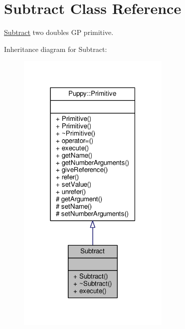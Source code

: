 \hypertarget{classSubtract}{}\section{Subtract Class Reference}
\label{classSubtract}


\hyperlink{classSubtract}{Subtract} two doubles G\+P primitive.  




Inheritance diagram for Subtract\+:
\nopagebreak
\begin{figure}[H]
\begin{center}
\leavevmode
\includegraphics[width=207pt]{classSubtract__inherit__graph}
\end{center}
\end{figure}


